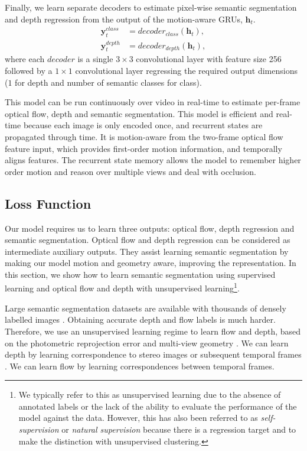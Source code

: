 Finally, we learn separate decoders to estimate pixel-wise semantic segmentation and depth regression from the output of the motion-aware GRUs, $\mathbf{h}_t$.
\begin{align}
\mathbf{y}^{class}_t &= decoder_{class}(\mathbf{h}_t), \\
\mathbf{y}^{depth}_t &= decoder_{depth}(\mathbf{h}_t),
\end{align}
where each $decoder$ is a single $3\times 3$ convolutional layer with feature size 256 followed by a $1 \times 1$ convolutional layer regressing the required output dimensions ($1$ for depth and number of semantic classes for class).

This model can be run continuously over video in real-time to estimate per-frame optical flow, depth and semantic segmentation. This model is efficient and real-time because each image is only encoded once, and recurrent states are propagated through time. It is motion-aware from the two-frame optical flow feature input, which provides first-order motion information, and temporally aligns features. The recurrent state memory allows the model to remember higher order motion and reason over multiple views and deal with occlusion.

\subsection{Loss Function}

Our model requires us to learn three outputs: optical flow, depth regression and semantic segmentation. Optical flow and depth regression can be considered as intermediate auxiliary outputs. They assist learning semantic segmentation by making our model motion and geometry aware, improving the representation. In this section, we show how to learn semantic segmentation using supervised learning and optical flow and depth with unsupervised learning\footnote{We typically refer to this as unsupervised learning \citep{garg2016unsupervised,monodepth17,zhou2017unsupervised} due to the absence of annotated labels or the lack of the ability to evaluate the performance of the model against the data. However, this has also been referred to as \textit{self-supervision} or \textit{natural supervision} \citep{koltun2017natural} because there is a regression target and to make the distinction with unsupervised clustering.}.

Large semantic segmentation datasets are available with thousands of densely labelled images \citep{lin2014microsoft,Cordts2016Cityscapes}.
Obtaining accurate depth and flow labels is much harder. Therefore, we use an unsupervised learning regime to learn flow and depth, based on the photometric reprojection error and multi-view geometry \citep{hartley2000}. We can learn depth by learning correspondence to stereo images \citep{garg2016unsupervised} or subsequent temporal frames \citep{zhou2017unsupervised}. We can learn flow by learning correspondences between temporal frames.

